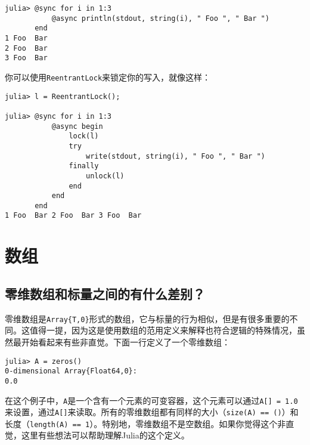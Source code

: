 \begin{verbatim}
julia> @sync for i in 1:3
           @async println(stdout, string(i), " Foo ", " Bar ")
       end
1 Foo  Bar
2 Foo  Bar
3 Foo  Bar
\end{verbatim}



你可以使用\texttt{ReentrantLock}来锁定你的写入，就像这样：




\begin{verbatim}
julia> l = ReentrantLock();

julia> @sync for i in 1:3
           @async begin
               lock(l)
               try
                   write(stdout, string(i), " Foo ", " Bar ")
               finally
                   unlock(l)
               end
           end
       end
1 Foo  Bar 2 Foo  Bar 3 Foo  Bar
\end{verbatim}



\hypertarget{11524621654961197830}{}


\section{数组}



\hypertarget{8539259979709593447}{}


\subsection{零维数组和标量之间的有什么差别？}



零维数组是\texttt{Array\{T,0\}}形式的数组，它与标量的行为相似，但是有很多重要的不同。这值得一提，因为这是使用数组的范用定义来解释也符合逻辑的特殊情况，虽然最开始看起来有些非直觉。下面一行定义了一个零维数组：




\begin{lstlisting}
julia> A = zeros()
0-dimensional Array{Float64,0}:
0.0
\end{lstlisting}



在这个例子中，\texttt{A}是一个含有一个元素的可变容器，这个元素可以通过\texttt{A[] = 1.0}来设置，通过\texttt{A[]}来读取。所有的零维数组都有同样的大小（\texttt{size(A) == ()}）和长度（\texttt{length(A) == 1}）。特别地，零维数组不是空数组。如果你觉得这个非直觉，这里有些想法可以帮助理解Julia的这个定义。



